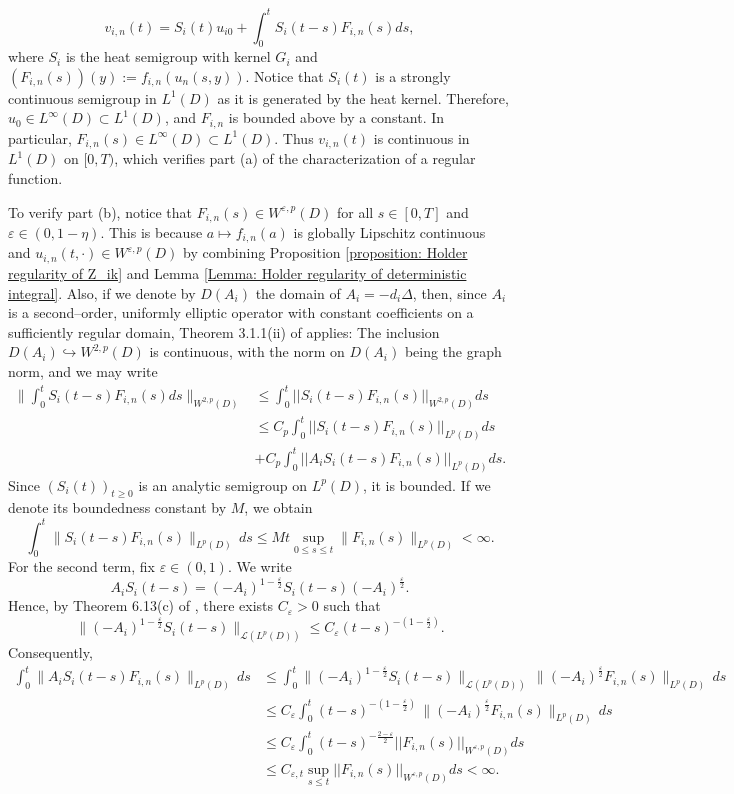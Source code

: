 \documentclass[12pt]{article}
\theoremstyle{definition}
\theoremstyle{remark}
\begin{document}
\[
v_{i,n}(t) = S_i(t)u_{i0} + \int_0^t S_i(t-s)F_{i,n}(s)ds,
\]
where $S_i$ is the heat semigroup with kernel $G_i$ and $(F_{i,n}(s))(y) := f_{i,n}(u_n(s,y))$. Notice that $S_i(t)$ is a strongly continuous semigroup  in $L^1(D)$ as it is generated by the heat kernel. Therefore, $u_0\in L^{\infty}(D)\subset L^1(D)$, and $F_{i,n}$ is bounded above by a constant. In particular,
$F_{i,n}(s)\in L^\infty(D) \subset L^1(D)$. Thus $v_{i,n}(t)$ is continuous in $L^1(D)$ on $[0,T)$, which verifies part (a) of the characterization of a regular function. 

To verify part (b), notice that $F_{i,n}(s)\in W^{\varepsilon,p}(D)$ for all $s\in [0,T]$ and $\varepsilon\in (0,1-\eta)$. This is because $a\mapsto f_{i,n}(a)$ is globally Lipschitz continuous and $u_{i,n}(t,\cdot) \in W^{\varepsilon,p}(D)$ by combining Proposition \ref{proposition: Holder regularity of Z_ik} and Lemma  \ref{Lemma: Holder regularity of deterministic integral}. Also, if we denote by $D(A_i)$ the domain of $A_i = -d_i\Delta$, then, since $A_i$ is a second--order, uniformly elliptic operator with constant coefficients on a sufficiently regular domain, Theorem 3.1.1(ii) of \cite{lunardi2012analytic} applies: The inclusion $D(A_i)\hookrightarrow W^{2,p}(D)$ is continuous, with the norm on $D(A_i)$ being the graph norm, and we may write
\begin{align*}
    \Bigg \| \int_0^t S_i(t-s)F_{i,n}(s)ds \Bigg \|_{W^{2,p}(D)}&\leq \int_0^t ||S_i(t-s)F_{i,n}(s)||_{W^{2,p}(D)}ds\\
    &\leq C_p\int_0^t ||S_i(t-s)F_{i,n}(s)||_{L^p(D)}ds\\
    &+C_p\int_0^t ||A_iS_i(t-s)F_{i,n}(s)||_{L^p(D)}ds.
\end{align*}
Since $(S_i(t))_{t\ge0}$ is an analytic semigroup on $L^p(D)$, it is bounded. If we denote its boundedness constant by $M$, we obtain
\[
\int_0^t \|S_i(t-s)F_{i,n}(s)\|_{L^p(D)}\,ds
\le M t\sup_{0\le s\le t}\|F_{i,n}(s)\|_{L^p(D)} < \infty.
\]
For the second term, fix $\varepsilon\in(0,1)$. We write
\[
A_iS_i(t-s)=(-A_i)^{1-\frac{\varepsilon}{2}}S_i(t-s)(-A_i)^{\frac{\varepsilon}{2}}.
\]
Hence, by Theorem 6.13(c) of \cite{pazy2012semigroups}, there exists $C_{\varepsilon}>0$ such that
\[
\|(-A_i)^{1-\frac{\varepsilon}{2}}S_i(t-s)\|_{\mathcal L(L^p(D))}
\le C_{\varepsilon} (t-s)^{-(1-\frac{\varepsilon}{2})}.
\]
Consequently,
\begin{align*}
\int_0^t \|A_i S_i(t-s)F_{i,n}(s)\|_{L^p(D)}\,ds
&\le \int_0^t \|(-A_i)^{1-\frac{\varepsilon}{2}}S_i(t-s)\|_{\mathcal L(L^p(D))}
   \,\|(-A_i)^{\frac{\varepsilon}{2}}F_{i,n}(s)\|_{L^p(D)}\,ds \\
&\le C_{\varepsilon}\int_0^t (t-s)^{-(1-\frac{\varepsilon}{2})}\,
   \|(-A_i)^{\frac{\varepsilon}{2}}F_{i,n}(s)\|_{L^p(D)}\,ds\\
&\leq C_{\varepsilon}\int_0^t (t-s)^{-\frac{2-\varepsilon}{2}}||F_{i,n}(s)||_{W^{\varepsilon,p}(D)}ds\\
&\leq C_{\varepsilon,t} \sup_{s\leq t} ||F_{i,n}(s)||_{W^{\varepsilon,p}(D)}ds < \infty.
\end{align*}
\end{document}
